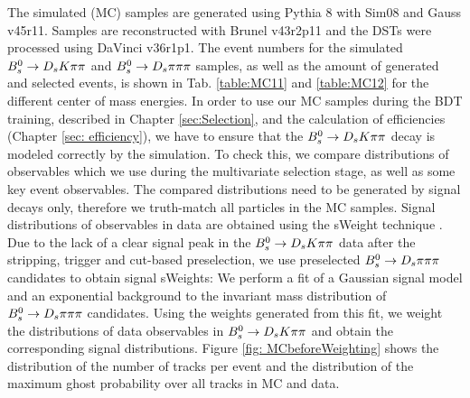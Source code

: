 The simulated (MC) samples are generated using Pythia 8 with Sim08 and Gauss v45r11. Samples are reconstructed with Brunel v43r2p11 and the DSTs were processed using DaVinci v36r1p1. 
The event numbers for the simulated ${{B}^0_{s}}\rightarrow{\ensuremath{{D}_{s}}}{\ensuremath{K}}{\ensuremath{\pi}}{\ensuremath{\pi}}$ and ${{B}^0_{s}}\rightarrow{\ensuremath{{D}_{s}}}{\ensuremath{\pi}}{\ensuremath{\pi}}{\ensuremath{\pi}}$ samples, as well as the amount of generated and selected events, 
is shown in Tab. \ref{table:MC11} and \ref{table:MC12} for the different center of mass energies. \newline
In order to use our MC samples during the BDT training, described in Chapter \ref{sec:Selection}, and the calculation of efficiencies (Chapter \ref{sec: efficiency}), 
we have to ensure that the ${{B}^0_{s}}\rightarrow{\ensuremath{{D}_{s}}}{\ensuremath{K}}{\ensuremath{\pi}}{\ensuremath{\pi}}$ decay is modeled correctly by the simulation. 
To check this, we compare distributions of observables which we use during the multivariate selection stage, as well as some key event observables. 
The compared distributions need to be generated by signal decays only, therefore we truth-match all particles in the MC samples. 
Signal distributions of observables in data are obtained using the sWeight technique \cite{Pivk:2004ty}. 
Due to the lack of a clear signal peak in the ${{B}^0_{s}}\rightarrow{\ensuremath{{D}_{s}}}{\ensuremath{K}}{\ensuremath{\pi}}{\ensuremath{\pi}}$ data after the stripping, trigger and cut-based preselection, we use preselected ${{B}^0_{s}}\rightarrow{\ensuremath{{D}_{s}}}{\ensuremath{\pi}}{\ensuremath{\pi}}{\ensuremath{\pi}}$ candidates to obtain signal sWeights:  
We perform a fit of a Gaussian signal model and an exponential background to the invariant mass distribution of ${{B}^0_{s}}\rightarrow{\ensuremath{{D}_{s}}}{\ensuremath{\pi}}{\ensuremath{\pi}}{\ensuremath{\pi}}$ candidates. 
Using the weights generated from this fit, we weight the distributions of data observables in ${{B}^0_{s}}\rightarrow{\ensuremath{{D}_{s}}}{\ensuremath{K}}{\ensuremath{\pi}}{\ensuremath{\pi}}$ and obtain the corresponding signal distributions. \newline
Figure \ref{fig: MCbeforeWeighting} shows the distribution of the number of tracks per event and the distribution of the maximum ghost probability over all tracks in MC and data.

